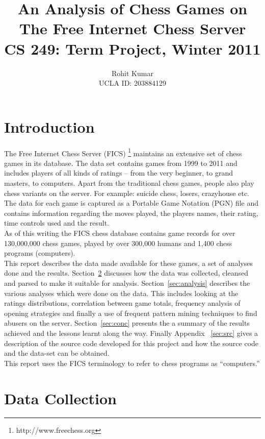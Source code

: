 \documentclass{article}
\author{Rohit Kumar \\UCLA ID: 203884129}
\title{An Analysis of Chess Games on The Free Internet Chess Server \\ CS 249: Term Project, Winter 2011}
\begin{document}
\maketitle


\section{Introduction}
\label{sec:intro}
The Free Internet Chess Server (FICS) \footnote{http://www.freechess.org} maintains an extensive set of chess games in its database. The data set contains games from 1999 to 2011 and includes players of all kinds of ratings -- from the very beginner, to grand masters, to computers. Apart from the traditional chess games, people also play chess variants on the server. For example: suicide chess, losers, crazyhouse etc. The data for each game is captured as a Portable Game Notation (PGN) \cite{wiki:pgn} file and contains information regarding the moves played, the players names, their rating, time controls used and the result. \\

As of this writing the FICS chess database contains game records for over 130,000,000 chess games, played by over 300,000 humans and 1,400 chess programs (computers).\\

This report describes the data made available for these games, a set of analyses done and the results. Section~\ref{sec:datacol} discusses how the data was collected, cleansed and parsed to make it suitable for analysis. Section~\ref{sec:analysis} describes the various analyses which were done on the data. This includes looking at the ratings distributions, correlation between game totals, frequency analysis of opening strategies and finally a use of frequent pattern mining techniques to find abusers on the server. Section~\ref{sec:conc} presents the a summary of the results achieved and the lessons learnt along the way. Finally Appendix ~\ref{sec:src} gives a description of the source code developed for this project and how the source code and the data-set can be obtained.\\


 This report uses the FICS terminology to refer to chess programs as ``computers.''

\section{Data Collection}
\label{sec:datacol}
\end{document}
